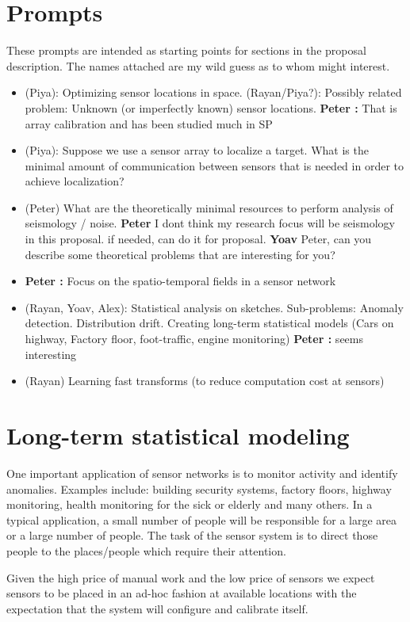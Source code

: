 \documentclass{article}
\newcommand{\comment}[3]{{\color{#1} {\bf #2 :} #3}}
\newcommand{\peter}[1]{\comment{purple}{Peter}{#1}}
\begin{document}
\section{Prompts}
These prompts are intended as starting points for sections in the proposal description. The names attached are my wild guess as to whom might interest.

\begin{itemize}
    \item (Piya): Optimizing sensor locations in space. (Rayan/Piya?): Possibly related problem: Unknown (or imperfectly known) sensor locations. {\peter That is array calibration and has been studied much in SP}
    \item (Piya): Suppose we use a sensor array to localize a target. What is the minimal amount of communication between sensors that is needed in order to achieve localization?
    \item (Peter) What are the theoretically minimal resources to perform analysis of seismology / noise. {\bf Peter} I dont think my research focus will be seismology in this proposal. if needed, can do it for proposal. {\bf Yoav} Peter, can you describe some theoretical problems that are interesting for you?
    \item {\peter Focus on the spatio-temporal fields in a  sensor network}
    \item (Rayan, Yoav, Alex): Statistical analysis on sketches. Sub-problems: Anomaly detection. Distribution drift. Creating long-term statistical models (Cars on highway, Factory floor, foot-traffic, engine monitoring){\peter seems interesting}
    \item (Rayan) Learning fast transforms (to reduce computation cost at sensors) 
\end{itemize}

\section{Long-term statistical modeling}
 One important application of sensor networks is to monitor activity and identify anomalies. Examples include: building security systems, factory floors, highway monitoring, health monitoring for the sick or elderly and many others. In a typical application, a small number of people will be responsible for a large area or a large number of people. The task of the sensor system is to direct those people to the places/people which require their attention. 
 
 Given the high price of manual work and the low price of sensors we expect sensors to be placed in an ad-hoc fashion at available locations with the expectation that the system will configure and calibrate itself.
 
\end{document}
